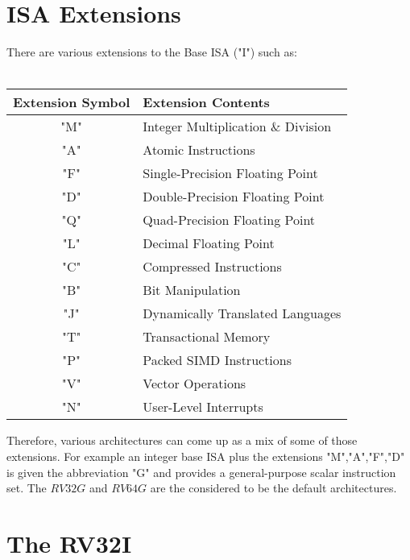 	\section{ISA Extensions}
	\label{sec:Extensions}
	There are various extensions to the Base ISA ("I") such as:  \\\\
	\vspace{-2mm}
	\begin{tabular}{|c|l|} \hline
	\setrow{\bfseries}Extension Symbol &\setrow{\bfseries} Extension Contents \\\hline
		"M" & Integer Multiplication \& Division     \\\hline
		"A" & Atomic Instructions 				     \\\hline
		"F" & Single-Precision Floating Point		 \\\hline
		"D" & Double-Precision Floating Point 		 \\\hline
		"Q" & Quad-Precision Floating Point          \\\hline
		"L" & Decimal Floating Point                 \\\hline
		"C" & Compressed Instructions                \\\hline
		"B" & Bit Manipulation 					     \\\hline
		"J" & Dynamically Translated Languages 		 \\\hline
		"T" & Transactional Memory 					 \\\hline
		"P" & Packed SIMD Instructions 			     \\\hline
		"V" & Vector Operations 					 \\\hline
		"N" & User-Level Interrupts					 \\\hline
	\end{tabular}
	\vspace{5mm}
	\par
	Therefore, various architectures can come up as a mix of some of those extensions. For example an integer base ISA plus the extensions "M","A","F","D" is given the abbreviation "G" and provides a general-purpose scalar instruction set. The $RV32G$ and $RV64G$ are the considered to be the default architectures.
	
	\section{The RV32I}
	\label{sec:RV32I}
